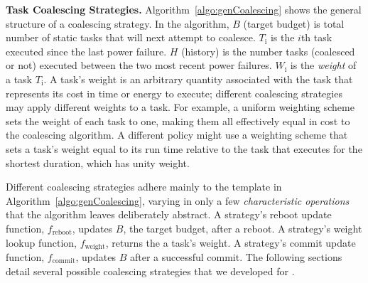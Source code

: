 \begin{figure}
\end{figure}
%
%

\noindent \textbf{Task Coalescing Strategies.} Algorithm~\ref{algo:genCoalescing} shows the general structure of a coalescing strategy. In the algorithm, $B$ (target budget) is total number of static tasks
that \sys will next attempt to coalesce. $T_\text{i}$ is the $i$th task
executed since the last power failure. $H$ (history) is the number tasks
(coalesced or not) executed between the two most recent power failures.
$W_\text{i}$ is the {\em weight} of a task $T_\text{i}$.  A task's weight is an
arbitrary quantity associated with the task that represents its cost in time or
energy to execute; different coalescing strategies may apply different weights
to a task.  For example, a uniform weighting scheme sets the weight of each
task to one, making them all effectively equal in cost to the coalescing
algorithm.  A different policy might use a weighting scheme that sets a task's
weight equal to its run time relative to the task that executes for the
shortest duration, which has unity weight. 

Different coalescing strategies adhere mainly to the template in
Algorithm~\ref{algo:genCoalescing}, varying in only a few {\em characteristic
operations} that the algorithm leaves deliberately abstract.  A strategy's
reboot update function, $f_\text{reboot}$, updates $B$, the target budget,
after a reboot. A strategy's weight lookup function, $f_\text{weight}$, returns
the a task's weight.  A strategy's commit update function, $f_\text{commit}$,
updates $B$ after a successful commit. The following sections detail several
possible coalescing strategies that we developed for \sys. 

